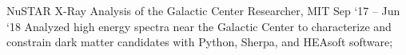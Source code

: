\experience
    {NuSTAR X-Ray Analysis of the Galactic Center}
    {Researcher, MIT}
    {Sep `17 -- Jun `18}
    {
        Analyzed high energy spectra near the Galactic Center to characterize and constrain dark
        matter candidates with Python, Sherpa, and HEAsoft software;
    }
